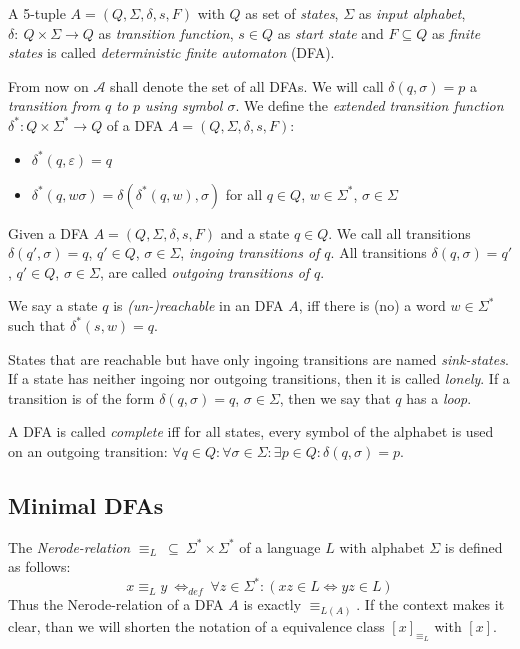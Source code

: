 \documentclass[a4paper, oneside, 11pt]{report}
\theoremstyle{definition}
\theoremstyle{remark}
\begin{document}
A 5-tuple $A = (Q, \Sigma, \delta, s, F)$ with $Q$ as set of \emph{states}, $\Sigma$ as \emph{input alphabet}, $\delta \colon\ Q \times \Sigma \to Q$ as \emph{transition function}, $s \in Q$ as \emph{start state} and $F \subseteq Q$ as \emph{finite states} is called \emph{deterministic finite automaton} (DFA).

From now on $\mathcal{A}$ shall denote the set of all DFAs. We will call $\delta(q,\sigma) = p$ a \emph{transition from $q$ to $p$ using symbol $\sigma$}.
We define the \emph{extended transition function} $\delta^* : Q \times \Sigma^* \to Q$ of a DFA $A = (Q, \Sigma, \delta, s, F)$:
\begin{itemize}
	\item $\delta^*(q,\varepsilon) = q$
	\item $\delta^*(q,w\sigma) = \delta(\delta^*(q,w),\sigma)$ for all $q \in Q$, $w \in \Sigma^*$, $\sigma \in \Sigma$
\end{itemize}
Given a DFA $A = (Q, \Sigma, \delta, s, F)$ and a state $q \in Q$. We call all transitions $\delta(q', \sigma) = q$, $q'\in Q$, $\sigma\in\Sigma$, \emph{ingoing transitions of $q$}. All transitions $\delta(q, \sigma) = q'$, $q'\in Q$, $\sigma\in\Sigma$, are called \emph{outgoing transitions of $q$}.

We say a state $q$ is \emph{(un-)reachable} in an DFA $A$, iff there is (no) a word $w \in \Sigma^*$ such that $\delta^*(s, w) = q$.

States that are reachable but have only ingoing transitions are named \emph{sink-states}.
If a state has neither ingoing nor outgoing transitions, then it is called \emph{lonely}.
If a transition is of the form $\delta(q, \sigma) = q$, $\sigma\in\Sigma$, then we say that $q$ has a \emph{loop}.

A DFA is called \emph{complete} iff for all states, every symbol of the alphabet is used on an outgoing transition: $\forall q\in Q\colon \forall\sigma\in\Sigma\colon \exists p\in Q\colon \delta(q,\sigma) = p$.

\subsection{Minimal DFAs}

The \emph{Nerode-relation} $\equiv_L\ \subseteq\ \Sigma^* \times \Sigma^*$ of a language $L$ with alphabet $\Sigma$ is defined as follows:
\begin{displaymath}
	x \equiv_L y\ \Leftrightarrow_{def}\ \forall z\in\Sigma^*\colon (xz\in L \Leftrightarrow yz\in L)
\end{displaymath}
Thus the Nerode-relation of a DFA $A$ is exactly $\equiv_{L(A)}$. If the context makes it clear, than we will shorten the notation of a equivalence class $[x]_{\equiv_L}$ with $[x]$.
\end{document}
